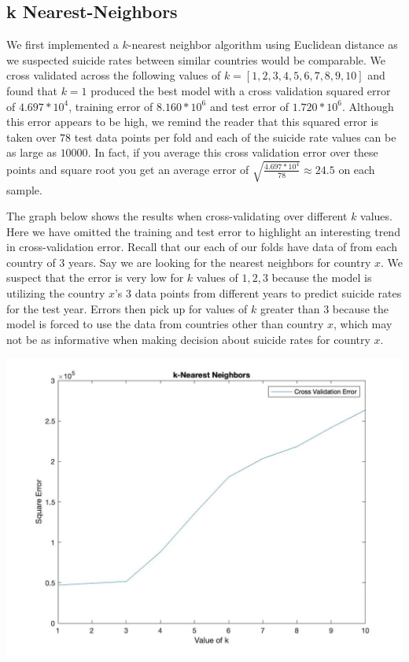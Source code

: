 \documentclass{article}
\begin{document}
\begin{multicols}{2}
\subsection{k Nearest-Neighbors} We first implemented a $k$-nearest neighbor algorithm using Euclidean distance as we suspected suicide rates between similar countries would be comparable. We cross validated across the following values of $k = [1,2, 3, 4, 5, 6, 7, 8, 9, 10]$ and found that $k = 1$ produced the best model with a cross validation squared error of $4.697 * 10^4$, training error of $8.160 * 10^6$ and test error of $1.720 * 10^6$. Although this error appears to be high, we remind the reader that this squared error is taken over $78$ test data points per fold and each of the suicide rate values can be as large as $10000$. In fact, if you average this cross validation error over these points and square root you get an average error of $\sqrt{\frac{4.697 * 10^4}{78}} \approx 24.5 $ on each sample. 

The graph below shows the results when cross-validating over different $k$ values. Here we have omitted the training and test error to highlight an interesting trend in cross-validation error. Recall that our each of our folds have data of from each country of $3$ years. Say we are looking for the nearest neighbors for country $x$. We suspect that the error is very low for $k$ values of $1, 2, 3$ because the model is utilizing the country $x$'s $3$ data points from different years to predict suicide rates for the test year. Errors then pick up for values of $k$ greater than $3$ because the model is forced to use the data from countries other than country $x$, which may not be as informative when making decision about suicide rates for country $x$. 

\includegraphics[width=\columnwidth]{../Figures/k_nn_cv_err.jpg}


\end{multicols}
\end{document}
